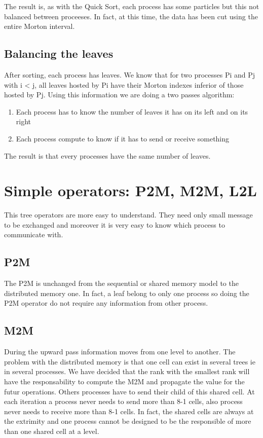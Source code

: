 \documentclass[10pt,letterpaper,titlepage]{report}
\begin{document}
The result is, as with the Quick Sort, each process has some particles but this not balanced between proceeses.
In fact, at this time, the data has been cut using the entire Morton interval.


\section{Balancing the leaves}
After sorting, each process has leaves.
We know that for two processes Pi and Pj with i < j, all leaves hosted by Pi have their Morton indexes inferior of those hosted by Pj.
Using this information we are doing a two passes algorithm:
\begin{enumerate}
\item Each process has to know the number of leaves it has on its left and on its right
\item Each process compute to know if it has to send or receive something
\end{enumerate}
The result is that every processes have the same number of leaves.


\chapter{Simple operators: P2M, M2M, L2L}
This tree operators are more easy to understand.
They need only small message to be exchanged and moreover it is very easy to know which process to communicate with.

\section{P2M}
The P2M is unchanged from the sequential or shared memory model to the distributed memory one.
In fact, a leaf belong to only one process so doing the P2M operator do not require any information from other process.


\section{M2M}
During the upward pass information moves from one level to another.
The problem with the distributed memory is that one cell can exist in several trees ie in several processes.
We have decided that the rank with the smallest rank will have the responsability to compute the M2M and propagate the value for the futur operations.
Others processes have to send their child of this shared cell.
At each iteration a process never needs to send more than 8-1 cells, also process never needs to receive more than 8-1 cells.
In fact, the shared cells are always at the extrimity and one process cannot be designed to be the responsible of more than one shared cell at a level.
\end{document}
